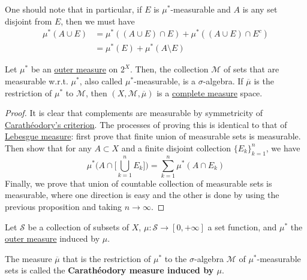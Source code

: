 	One should note that in particular, if $E$ is $\mu^\ast$-measurable and $A$ is any set disjoint from $E$, then we must have 
	\begin{align}
		\mu^\ast (A \cup E) & = \mu^\ast ((A \cup E) \cap E) + \mu^\ast ((A \cup E) \cap E^c) \\ 
												& = \mu^\ast (E) + \mu^\ast (A \setminus E)
	\end{align}

  \begin{theorem}
    \label{thm:measurable-sets-is-a-sigma-algebra}
    Let $\mu^\ast$ be an \hyperref[def:outer-measure]{outer measure} on $2^X$. Then, the collection $\mathcal{M}$ of sets that are measurable w.r.t. $\mu^\ast$, also called $\mu^\ast$-measurable, is a $\sigma$-algebra. If $\overline{\mu}$ is the restriction of $\mu^\ast$ to $\mathcal{M}$, then $(X, \mathcal{M}, \overline{\mu})$ is a \hyperref[def:complete-measure]{complete measure} space. 
  \end{theorem}
  \begin{proof}
    It is clear that complements are measurable by symmetricity of \hyperref[def:caratheodorys-criterion]{Carathéodory's criterion}. The processes of proving this is identical to that of \hyperref[def:lebesgue-measure]{Lebesgue measure}: first prove that finite union of measurable sets is measurable. Then show that for any $A \subset X$ and a finite disjoint collection $\{E_k\}_{k=1}^n$, we have 
    \begin{equation}
      \mu^\ast \bigg( A \cap \bigg[ \bigcup_{k=1}^n E_k \bigg] \bigg) = \sum_{k=1}^n \mu^\ast (A \cap E_k) 
    \end{equation}
    Finally, we prove that union of countable collection of measurable sets is measurable, where one direction is easy and the other is done by using the previous proposition and taking $n \to \infty$. 
  \end{proof}

  \begin{definition}
    \label{def:caratheodory-measure}
    Let $\mathcal{S}$ be a collection of subsets of $X$, $\mu: \mathcal{S} \to [0, +\infty]$ a set function, and $\mu^\ast$ the \hyperref[def:outer-measure]{outer measure} induced by $\mu$. 

		The measure $\overline{\mu}$ that is the restriction of $\mu^\ast$ to the $\sigma$-algebra $\mathcal{M}$ of $\mu^\ast$-measurable sets is called the \textbf{Carathéodory measure induced by $\mu$}. 
  \end{definition}

